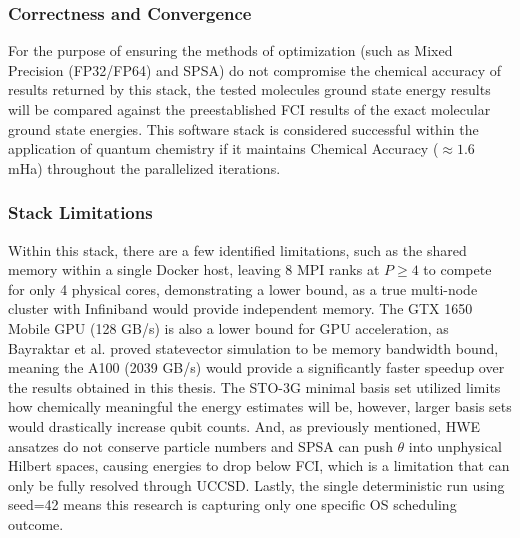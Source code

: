 \subsubsection{Correctness and Convergence}
For the purpose of ensuring the methods of optimization (such as Mixed Precision (FP32/FP64) and SPSA) do not compromise the chemical accuracy of 
results returned by this stack, the tested molecules ground state energy results will be compared against the preestablished 
FCI results of the exact molecular ground state energies\parencite{szabo1996modernquantumchemistry}. This software stack is considered successful 
within the application of quantum chemistry if it maintains Chemical Accuracy ($\approx 1.6$ mHa)\parencite{szabo1996modernquantumchemistry} throughout the parallelized iterations. 

\subsubsection{Stack Limitations}
Within this stack, there are a few identified limitations, such as the shared memory within a single Docker host, leaving 8 MPI ranks at $P \geq 4$
to compete for only 4 physical cores, demonstrating a lower bound, as a true multi-node cluster with Infiniband would provide independent memory. 
The GTX 1650 Mobile GPU (128 GB/s) is also a lower bound for GPU acceleration, as Bayraktar et al. proved statevector simulation to be memory bandwidth bound, meaning
the A100 (2039 GB/s) would provide a significantly faster speedup over the results obtained in this thesis.
The STO-3G minimal basis set utilized limits how chemically meaningful the energy estimates will be, however, larger basis sets would drastically increase qubit counts. 
And, as previously mentioned, HWE ansatzes do not conserve particle numbers and SPSA can push $\theta$ into unphysical Hilbert spaces, causing energies to drop
below FCI, which is a limitation that can only be fully resolved through UCCSD. Lastly, the single deterministic run using seed=42 means this research is capturing
only one specific OS scheduling outcome. 





